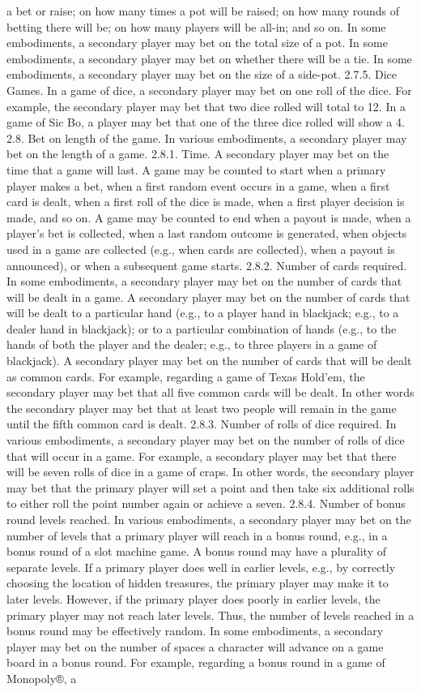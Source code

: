 \documentclass[11pt,a4paper]{article}
\begin{document}
a bet or raise; on how many times a pot will be raised; on how many rounds of betting there will be; on how many players will be all-in; and so on. In some embodiments, a secondary player may bet on the total size of a pot. In some embodiments, a secondary player may bet on whether there will be a tie. In some embodiments, a secondary player may bet on the size of a side-pot. 2.7.5. Dice Games. In a game of dice, a secondary player may bet on one roll of the dice. For example, the secondary player may bet that two dice rolled will total to 12. In a game of Sic Bo, a player may bet that one of the three dice rolled will show a 4. 2.8. Bet on length of the game. In various embodiments, a secondary player may bet on the length of a game. 2.8.1. Time. A secondary player may bet on the time that a game will last. A game may be counted to start when a primary player makes a bet, when a first random event occurs in a game, when a first card is dealt, when a first roll of the dice is made, when a first player decision is made, and so on. A game may be counted to end when a payout is made, when a player's bet is collected, when a last random outcome is generated, when objects used in a game are collected (e.g., when cards are collected), when a payout is announced), or when a subsequent game starts. 2.8.2. Number of cards required. In some embodiments, a secondary player may bet on the number of cards that will be dealt in a game. A secondary player may bet on the number of cards that will be dealt to a particular hand (e.g., to a player hand in blackjack; e.g., to a dealer hand in blackjack); or to a particular combination of hands (e.g., to the hands of both the player and the dealer; e.g., to three players in a game of blackjack). A secondary player may bet on the number of cards that will be dealt as common cards. For example, regarding a game of Texas Hold'em, the secondary player may bet that all five common cards will be dealt. In other words the secondary player may bet that at least two people will remain in the game until the fifth common card is dealt. 2.8.3. Number of rolls of dice required. In various embodiments, a secondary player may bet on the number of rolls of dice that will occur in a game. For example, a secondary player may bet that there will be seven rolls of dice in a game of craps. In other words, the secondary player may bet that the primary player will set a point and then take six additional rolls to either roll the point number again or achieve a seven. 2.8.4. Number of bonus round levels reached. In various embodiments, a secondary player may bet on the number of levels that a primary player will reach in a bonus round, e.g., in a bonus round of a slot machine game. A bonus round may have a plurality of separate levels. If a primary player does well in earlier levels, e.g., by correctly choosing the location of hidden treasures, the primary player may make it to later levels. However, if the primary player does poorly in earlier levels, the primary player may not reach later levels. Thus, the number of levels reached in a bonus round may be effectively random. In some embodiments, a secondary player may bet on the number of spaces a character will advance on a game board in a bonus round. For example, regarding a bonus round in a game of Monopoly®, a 
\end{document}
